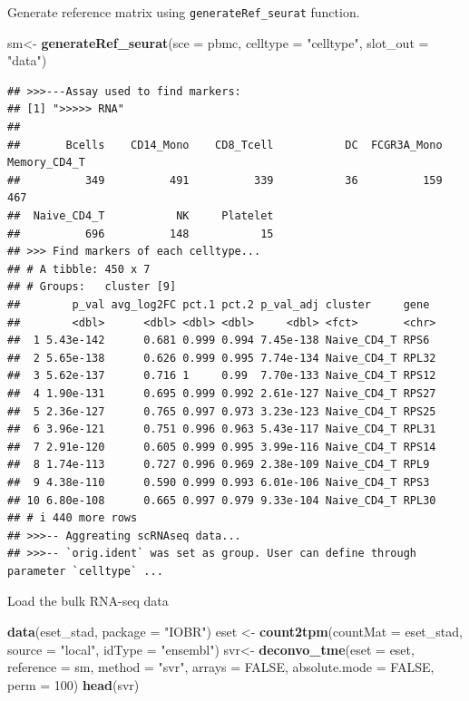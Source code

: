 \documentclass[
  12pt,
]{book}
\newenvironment{Shaded}{\begin{snugshade}}{\end{snugshade}}
\newcommand{\AttributeTok}[1]{\textcolor[rgb]{0.13,0.29,0.53}{#1}}
\newcommand{\ConstantTok}[1]{\textcolor[rgb]{0.56,0.35,0.01}{#1}}
\newcommand{\DecValTok}[1]{\textcolor[rgb]{0.00,0.00,0.81}{#1}}
\newcommand{\FunctionTok}[1]{\textcolor[rgb]{0.13,0.29,0.53}{\textbf{#1}}}
\newcommand{\NormalTok}[1]{#1}
\newcommand{\OtherTok}[1]{\textcolor[rgb]{0.56,0.35,0.01}{#1}}
\newcommand{\StringTok}[1]{\textcolor[rgb]{0.31,0.60,0.02}{#1}}
\begin{document}
Generate reference matrix using \texttt{generateRef\_seurat} function.

\begin{Shaded}
\begin{Highlighting}[]
\NormalTok{sm}\OtherTok{\textless{}{-}} \FunctionTok{generateRef\_seurat}\NormalTok{(}\AttributeTok{sce =}\NormalTok{ pbmc, }\AttributeTok{celltype =} \StringTok{"celltype"}\NormalTok{, }\AttributeTok{slot\_out =} \StringTok{"data"}\NormalTok{)}
\end{Highlighting}
\end{Shaded}

\begin{verbatim}
## >>>---Assay used to find markers: 
## [1] ">>>>> RNA"
## 
##       Bcells    CD14_Mono    CD8_Tcell           DC  FCGR3A_Mono Memory_CD4_T 
##          349          491          339           36          159          467 
##  Naive_CD4_T           NK     Platelet 
##          696          148           15 
## >>> Find markers of each celltype... 
## # A tibble: 450 x 7
## # Groups:   cluster [9]
##        p_val avg_log2FC pct.1 pct.2 p_val_adj cluster     gene 
##        <dbl>      <dbl> <dbl> <dbl>     <dbl> <fct>       <chr>
##  1 5.43e-142      0.681 0.999 0.994 7.45e-138 Naive_CD4_T RPS6 
##  2 5.65e-138      0.626 0.999 0.995 7.74e-134 Naive_CD4_T RPL32
##  3 5.62e-137      0.716 1     0.99  7.70e-133 Naive_CD4_T RPS12
##  4 1.90e-131      0.695 0.999 0.992 2.61e-127 Naive_CD4_T RPS27
##  5 2.36e-127      0.765 0.997 0.973 3.23e-123 Naive_CD4_T RPS25
##  6 3.96e-121      0.751 0.996 0.963 5.43e-117 Naive_CD4_T RPL31
##  7 2.91e-120      0.605 0.999 0.995 3.99e-116 Naive_CD4_T RPS14
##  8 1.74e-113      0.727 0.996 0.969 2.38e-109 Naive_CD4_T RPL9 
##  9 4.38e-110      0.590 0.999 0.993 6.01e-106 Naive_CD4_T RPS3 
## 10 6.80e-108      0.665 0.997 0.979 9.33e-104 Naive_CD4_T RPL30
## # i 440 more rows
## >>>-- Aggreating scRNAseq data...
## >>>-- `orig.ident` was set as group. User can define through parameter `celltype` ...
\end{verbatim}

Load the bulk RNA-seq data

\begin{Shaded}
\begin{Highlighting}[]
\FunctionTok{data}\NormalTok{(eset\_stad, }\AttributeTok{package =} \StringTok{"IOBR"}\NormalTok{)}
\NormalTok{eset }\OtherTok{\textless{}{-}} \FunctionTok{count2tpm}\NormalTok{(}\AttributeTok{countMat =}\NormalTok{ eset\_stad, }\AttributeTok{source =} \StringTok{"local"}\NormalTok{, }\AttributeTok{idType =} \StringTok{"ensembl"}\NormalTok{)}
\NormalTok{svr}\OtherTok{\textless{}{-}} \FunctionTok{deconvo\_tme}\NormalTok{(}\AttributeTok{eset =}\NormalTok{ eset, }\AttributeTok{reference  =}\NormalTok{ sm,  }\AttributeTok{method =} \StringTok{"svr"}\NormalTok{, }\AttributeTok{arrays  =} \ConstantTok{FALSE}\NormalTok{, }\AttributeTok{absolute.mode =} \ConstantTok{FALSE}\NormalTok{, }\AttributeTok{perm =} \DecValTok{100}\NormalTok{)}
\FunctionTok{head}\NormalTok{(svr)}
\end{Highlighting}
\end{Shaded}
\end{document}
